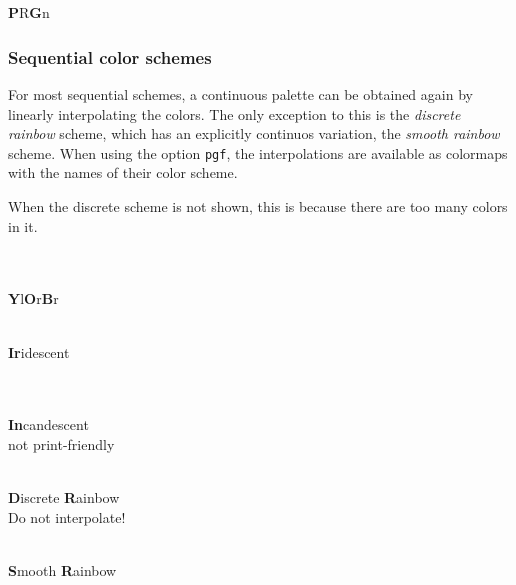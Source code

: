 \documentclass{scrartcl}
\begin{document}
\begin{center}
    \\
    \\
    \textbf{P}R\textbf{G}n
\end{center}\clearpage

\subsubsection{Sequential color schemes}\label{sec:T-S}
For most sequential schemes, a continuous palette can be obtained again by linearly interpolating the colors.
The only exception to this is the \emph{discrete rainbow} scheme, which has an explicitly continuos variation, the \emph{smooth rainbow} scheme.
When using the option \verb!pgf!, the interpolations are available as colormaps with the names of their color scheme.

When the discrete scheme is not shown, this is because there are too many colors in it.

\begin{center}
    \\
    \\
    \textbf{Y}l\textbf{O}r\textbf{B}r
\end{center}

\begin{center}
    \\
    \textbf{Ir}idescent
\end{center}

\begin{center}
    \\
    \\
    \textbf{In}candescent\\
    not print-friendly
\end{center}

\begin{center}
    \\
    \textbf{D}iscrete \textbf{R}ainbow\\
    Do not interpolate!
\end{center}

\begin{center}
    \\
    \textbf{S}mooth \textbf{R}ainbow\\
\end{center}\clearpage
\end{document}
